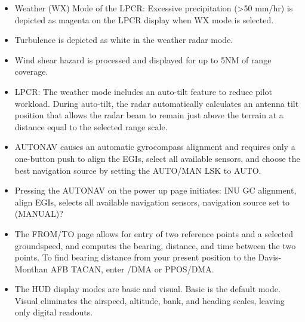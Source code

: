 \begin{itemize}
\item Weather (WX) Mode of the LPCR: Excessive precipitation (>50 mm/hr) is depicted as magenta on the LPCR display when WX mode is selected.
\item Turbulence is depicted as white in the weather radar mode.
\item Wind shear hazard is processed and displayed for up to 5NM of range coverage.
\item LPCR: The weather mode includes an auto-tilt feature to reduce pilot workload. During auto-tilt, the radar automatically calculates an antenna tilt position that allows the radar beam to remain just above the terrain  at a distance equal to the selected range scale.
\item AUTONAV causes an automatic gyrocompass  alignment and requires only a one-button push to align the EGIs, select all available sensors, and choose the best navigation source by setting the AUTO/MAN LSK to AUTO.
\item Pressing the AUTONAV on the power up page initiates: INU GC alignment, align EGIs, selects all available navigation sensors, navigation source set to (MANUAL)?
\item The FROM/TO page allows for entry of two reference points and a selected groundspeed, and computes the bearing, distance, and time between the two points. To find bearing distance from your present position to the Davis-Monthan AFB TACAN, enter /DMA or PPOS/DMA.
\item The HUD display modes are basic and visual. Basic is the default mode. Visual eliminates the airspeed, altitude, bank, and heading scales, leaving only digital readouts.
\end{itemize}
